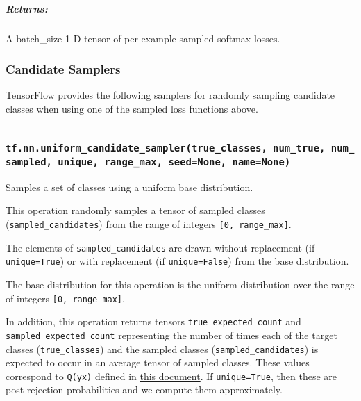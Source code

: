 \subparagraph{Returns: }\label{returns-24}

A batch\_size 1-D tensor of per-example sampled softmax losses.

\subsubsection{Candidate Samplers }\label{candidate-samplers}

TensorFlow provides the following samplers for randomly sampling
candidate classes when using one of the sampled loss functions above.

\begin{center}\rule{0.5\linewidth}{\linethickness}\end{center}

\subsubsection{\texorpdfstring{\texttt{tf.nn.uniform\_candidate\_sampler(true\_classes,\ num\_true,\ num\_sampled,\ unique,\ range\_max,\ seed=None,\ name=None)}
}{tf.nn.uniform\_candidate\_sampler(true\_classes, num\_true, num\_sampled, unique, range\_max, seed=None, name=None) }}\label{tf.nn.uniformux5fcandidateux5fsamplertrueux5fclasses-numux5ftrue-numux5fsampled-unique-rangeux5fmax-seednone-namenone}

Samples a set of classes using a uniform base distribution.

This operation randomly samples a tensor of sampled classes
(\texttt{sampled\_candidates}) from the range of integers
\texttt{{[}0,\ range\_max{]}}.

The elements of \texttt{sampled\_candidates} are drawn without
replacement (if \texttt{unique=True}) or with replacement (if
\texttt{unique=False}) from the base distribution.

The base distribution for this operation is the uniform distribution
over the range of integers \texttt{{[}0,\ range\_max{]}}.

In addition, this operation returns tensors
\texttt{true\_expected\_count} and \texttt{sampled\_expected\_count}
representing the number of times each of the target classes
(\texttt{true\_classes}) and the sampled classes
(\texttt{sampled\_candidates}) is expected to occur in an average tensor
of sampled classes. These values correspond to \texttt{Q(y\textbar{}x)}
defined in
\href{http://www.tensorflow.org/extras/candidate_sampling.pdf}{this
document}. If \texttt{unique=True}, then these are post-rejection
probabilities and we compute them approximately.


